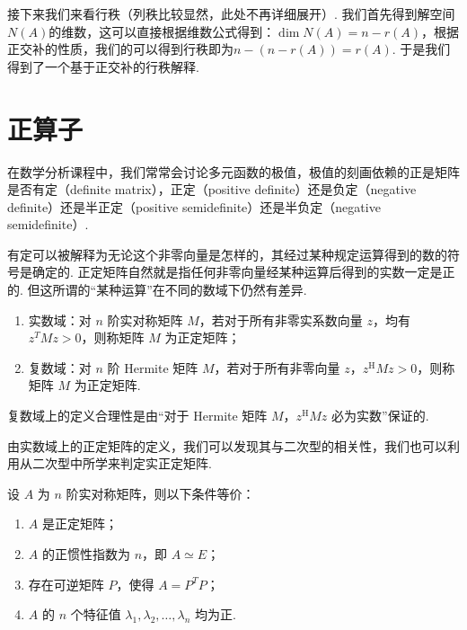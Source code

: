 接下来我们来看行秩（列秩比较显然，此处不再详细展开）. 我们首先得到解空间$N(A)$的维数，这可以直接根据维数公式得到：$\dim N(A) = n-r(A)$，根据正交补的性质，我们的可以得到行秩即为$n-(n-r(A))=r(A)$. 于是我们得到了一个基于正交补的行秩解释.

\section{正算子}

在数学分析课程中，我们常常会讨论多元函数的极值，极值的刻画依赖的正是矩阵是否有定（definite matrix），正定（positive definite）还是负定（negative definite）还是半正定（positive semidefinite）还是半负定（negative semidefinite）.

有定可以被解释为无论这个非零向量是怎样的，其经过某种规定运算得到的数的符号是确定的. 正定矩阵自然就是指任何非零向量经某种运算后得到的实数一定是正的. 但这所谓的``某种运算''在不同的数域下仍然有差异.

\begin{definition}[正定矩阵] 
    \begin{enumerate}
        \item 实数域：对 $ n $ 阶实对称矩阵 $ M $，若对于所有非零实系数向量 $ z $，均有$ z^{T}Mz > 0 $，则称矩阵 $ M $ 为正定矩阵；

        \item 复数域：对 $ n $ 阶 Hermite 矩阵 $ M $，若对于所有非零向量 $ z $，$ z^\mathrm{H}Mz > 0 $，则称矩阵 $ M $ 为正定矩阵.
    \end{enumerate}
\end{definition}

复数域上的定义合理性是由``对于 Hermite 矩阵 $ M $，$ z^\mathrm{H}Mz $ 必为实数''保证的.

由实数域上的正定矩阵的定义，我们可以发现其与二次型的相关性，我们也可以利用从二次型中所学来判定实正定矩阵.

\begin{theorem}
    设 $ A $ 为 $ n $ 阶实对称矩阵，则以下条件等价：
    \begin{enumerate}
        \item $ A $ 是正定矩阵；

        \item $ A $ 的正惯性指数为 $ n $，即 $ A \simeq E $；

        \item 存在可逆矩阵 $ P $，使得 $ A = P^{T}P $；

        \item $ A $ 的 $ n $ 个特征值 $ \lambda_1, \lambda_2, \ldots, \lambda_n $ 均为正.
    \end{enumerate}
\end{theorem}

